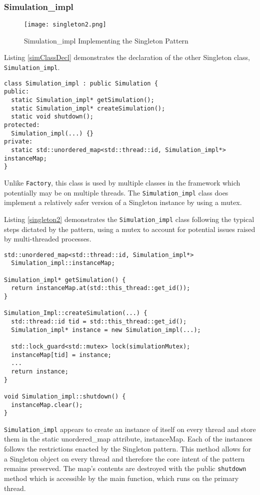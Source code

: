\subsubsection{Simulation\_impl}

\begin{figure}[ht]
  \caption{Simulation\_impl Implementing the Singleton Pattern}
  \centering
  \texttt{[image: singleton2.png]}
\end{figure}

Listing \ref{simClassDecl} demonstrates the declaration of the other Singleton class, \texttt{Simulation\_impl}.

\begin{lstlisting}[style=customC++,label=simClassDecl,caption=Excerpt of Simulation\_impl Interface \\ File: src/sst/core/simulation\_impl.h]
class Simulation_impl : public Simulation {
public:
  static Simulation_impl* getSimulation();
  static Simulation_impl* createSimulation();
  static void shutdown();
protected:
  Simulation_impl(...) {}
private:
  static std::unordered_map<std::thread::id, Simulation_impl*> instanceMap;
}
\end{lstlisting}

Unlike \texttt{Factory}, this class is used by multiple classes in the framework which potentially may be on multiple threads. The \texttt{Simulation\_impl} class does implement a relatively safer version of a Singleton instance by using a mutex.

Listing \ref{singleton2} demonstrates the \texttt{Simulation\_impl} class following the typical steps dictated by the pattern, using a mutex to account for potential issues raised by multi-threaded processes.

\begin{lstlisting}[style=customC++,label=singleton2,caption=Simulation\_impl Implementing the Singleton Pattern \\ File: src/sst/core/simulation\_impl.cc]
std::unordered_map<std::thread::id, Simulation_impl*>
  Simulation_impl::instanceMap;

Simulation_impl* getSimulation() {
  return instanceMap.at(std::this_thread::get_id());
}

Simulation_Impl::createSimulation(...) {
  std::thread::id tid = std::this_thread::get_id();
  Simulation_impl* instance = new Simulation_impl(...);

  std::lock_guard<std::mutex> lock(simulationMutex);
  instanceMap[tid] = instance;
  ...
  return instance;
}

void Simulation_impl::shutdown() {
  instanceMap.clear();
}
\end{lstlisting}

\texttt{Simulation\_impl} appears to create an instance of itself on every thread and store them in the static unordered\_map attribute, instanceMap. Each of the instances follows the restrictions enacted by the Singleton pattern. This method allows for a Singleton object on every thread and therefore the core intent of the pattern remains preserved. The map's contents are destroyed with the public \texttt{shutdown} method which is accessible by the main function, which runs on the primary thread.
